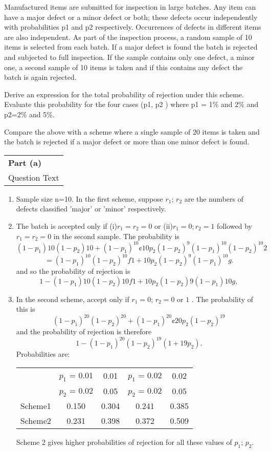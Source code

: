 \documentclass[a4paper,12pt]{article}
\begin{document}
Manufactured items are submitted for inspection in large batches.  Any item can have a major defect or a minor defect or both; these defects occur independently with probabilities p1 and p2 respectively.  Occurrences of defects in different items are also independent.  As part of the inspection process, a random sample of 10 items is selected from each batch.  If a major defect is found the batch is rejected and subjected to full inspection.  If the sample contains only one defect, a minor one, a second sample of 10 items is taken and if this contains any defect the batch is again rejected. 

Derive an expression for the total probability of rejection under this scheme. 
Evaluate this probability for the four cases (p1, p2 ) where p1 = 1\% and 2\% and p2=2\% and 5\%.

Compare the above with a scheme where a single sample of 20 items is taken and the batch is rejected if a major defect or more than one minor defect is found.

\begin{table}[ht!]
     \centering
     \begin{tabular}{|p{15cm}|}
     \hline        
 \noindent \textbf{Part (a)}\\
\noindent Question Text

\\ \hline
 \end{tabular}
\end{table}
\begin{enumerate}
    \item Sample size n=10. In the first scheme, suppose $r_1$; $r_2$ are the numbers of defects classified
’major’ or ’minor’ respectively.
\item The batch is accepted only if (i)$r_1 = r_2 = 0$ or (ii)$r_1 = 0; r_2 = 1$ followed by $r_1 = r_2 = 0$ in the
second sample.
The probability is \[(1 - p_1)10(1 - p_2)10 + (1 - p_1)^{10} ¢ 10p_2(1 - p_2)^9(1 - p_1)^{10}(1 - p_2)^{10}
2\]
\[= (1 - p_1)^{10}(1 - p_2)^{10}f1 + 10p_2(1 - p_2)^{9}(1 - p_1)^{10}g .\]
and so the probability of rejection is
\[1 - (1 - p_1)10(1 - p_2)10f1 + 10p_2(1 - p_2)9(1 - p_1)10g,\]
\item In the second scheme, accept only if $r_1 = 0$; $r_2 = 0$ or $1$ .
The probability of this is \[(1 - p_1)^{20}(1-p_2)^{20} + (1 - p_1)^{20} ¢ 20p_2(1 -p_2)^{19}\] and the probability of
rejection is therefore \[1 - (1 - p_1)^{20}(1 - p_2)^{19}(1 + 19p_2).\]
Probabilities are:
\begin{center}
\begin{tabular}{|c|c|c|c|c|}\hline
&$p_1$ = 0.01 & 0.01& $p_1$ = 0.02&  0.02 \\
&$p_2$ = 0.02 &0.05 & $p_2$ = 0.02&  0.05\\  \hline
Scheme1 & 0.150 & 0.304&  0.241&  0.385\\ \hline
Scheme2 & 0.231 & 0.398&  0.372&  0.509\\ \hline
\end{tabular}
\end{center}

Scheme 2 gives higher probabilities of rejection for all these values of $p_1$; $p_2$.
\end{enumerate}
\end{document}
